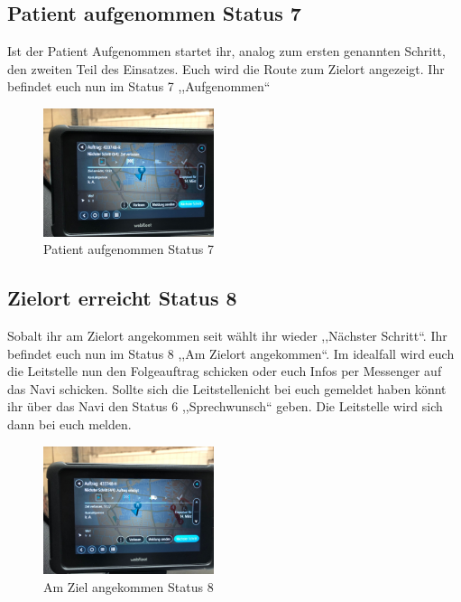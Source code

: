 \documentclass[a4paper,12pt]{scrartcl}
\begin{document}
    \subsection{Patient aufgenommen Status 7}
    Ist der Patient Aufgenommen startet ihr, analog zum ersten genannten Schritt, den zweiten Teil des Einsatzes. Euch wird die Route zum Zielort angezeigt.
    Ihr befindet euch nun im Status 7 ,,Aufgenommen``
    \begin{figure}[h]
        \begin{center}
            \includegraphics[width=5cm]{bilder/aufgenommen.jpg}
            \caption{Patient aufgenommen Status 7}
            \label{Patient aufgenommen}
        \end{center} 
    \end{figure}

    \newpage
    \subsection{Zielort erreicht Status 8}
    Sobalt ihr am Zielort angekommen seit wählt ihr wieder ,,Nächster Schritt``. Ihr befindet euch nun im Status 8 ,,Am Zielort angekommen``.
    Im idealfall wird euch die Leitstelle nun den Folgeauftrag schicken oder euch Infos per Messenger auf das Navi schicken. Sollte sich die Leitstellenicht bei euch 
    gemeldet haben könnt ihr über das Navi den Status 6 ,,Sprechwunsch`` geben. Die Leitstelle wird sich dann bei euch melden.
    \begin{figure}[h]
        \begin{center}
            \includegraphics[width=5cm]{bilder/angekommen.jpg}
            \caption{Am Ziel angekommen Status 8}
            \label{Ziel}
        \end{center} 
    \end{figure}
\end{document}
